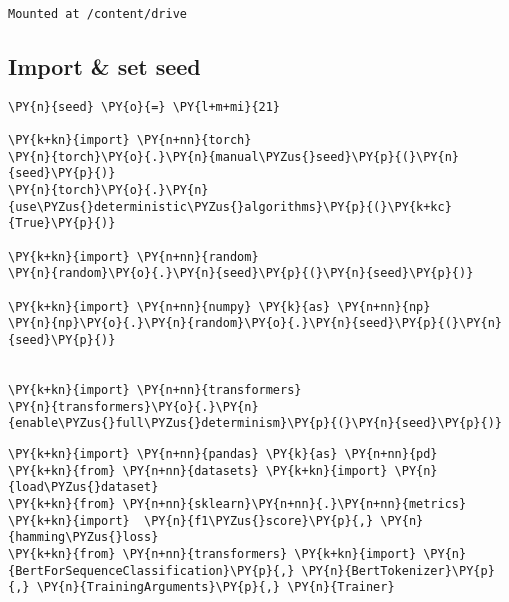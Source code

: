 \documentclass[../main.tex]{subfiles}
\begin{document}
    \begin{Verbatim}[commandchars=\\\{\}]
Mounted at /content/drive
    \end{Verbatim}

    \subsection{Import \& set seed}\label{import-set-seed}

    \begin{tcolorbox}[breakable, size=fbox, boxrule=1pt, pad at break*=1mm,colback=cellbackground, colframe=cellborder]
\begin{Verbatim}[commandchars=\\\{\}]
\PY{n}{seed} \PY{o}{=} \PY{l+m+mi}{21}

\PY{k+kn}{import} \PY{n+nn}{torch}
\PY{n}{torch}\PY{o}{.}\PY{n}{manual\PYZus{}seed}\PY{p}{(}\PY{n}{seed}\PY{p}{)}
\PY{n}{torch}\PY{o}{.}\PY{n}{use\PYZus{}deterministic\PYZus{}algorithms}\PY{p}{(}\PY{k+kc}{True}\PY{p}{)}

\PY{k+kn}{import} \PY{n+nn}{random}
\PY{n}{random}\PY{o}{.}\PY{n}{seed}\PY{p}{(}\PY{n}{seed}\PY{p}{)}

\PY{k+kn}{import} \PY{n+nn}{numpy} \PY{k}{as} \PY{n+nn}{np}
\PY{n}{np}\PY{o}{.}\PY{n}{random}\PY{o}{.}\PY{n}{seed}\PY{p}{(}\PY{n}{seed}\PY{p}{)}


\PY{k+kn}{import} \PY{n+nn}{transformers}
\PY{n}{transformers}\PY{o}{.}\PY{n}{enable\PYZus{}full\PYZus{}determinism}\PY{p}{(}\PY{n}{seed}\PY{p}{)}
\end{Verbatim}
\end{tcolorbox}

    \begin{tcolorbox}[breakable, size=fbox, boxrule=1pt, pad at break*=1mm,colback=cellbackground, colframe=cellborder]
\begin{Verbatim}[commandchars=\\\{\}]
\PY{k+kn}{import} \PY{n+nn}{pandas} \PY{k}{as} \PY{n+nn}{pd}
\PY{k+kn}{from} \PY{n+nn}{datasets} \PY{k+kn}{import} \PY{n}{load\PYZus{}dataset}
\PY{k+kn}{from} \PY{n+nn}{sklearn}\PY{n+nn}{.}\PY{n+nn}{metrics} \PY{k+kn}{import}  \PY{n}{f1\PYZus{}score}\PY{p}{,} \PY{n}{hamming\PYZus{}loss}
\PY{k+kn}{from} \PY{n+nn}{transformers} \PY{k+kn}{import} \PY{n}{BertForSequenceClassification}\PY{p}{,} \PY{n}{BertTokenizer}\PY{p}{,} \PY{n}{TrainingArguments}\PY{p}{,} \PY{n}{Trainer}
\end{Verbatim}
\end{tcolorbox}
\end{document}
